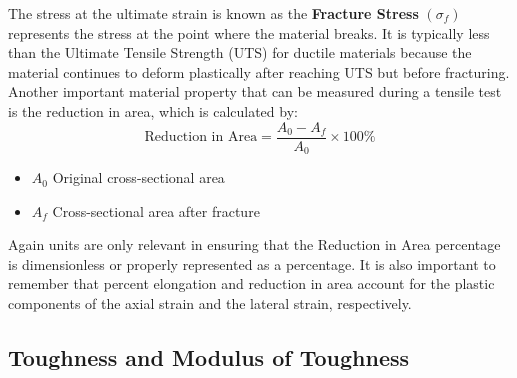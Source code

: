 \documentclass{article}
\begin{document}
{The stress at the ultimate strain is known as the \textbf{Fracture Stress} \((\sigma_f)\) represents the stress at the point where the material breaks. It is typically less than the Ultimate Tensile Strength (UTS) for ductile materials because the material continues to deform plastically after reaching UTS but before fracturing.\\[8pt]
Another important material property that can be measured during a tensile test is the reduction in area, which is calculated by:
\begin{equation}
    \text{Reduction in Area} = \frac{A_0 - A_f}{A_0} \times 100\%
\end{equation}
\begin{itemize}[itemsep=-1mm]
    \item $A_0$ Original cross-sectional area
    \item $A_f$ Cross-sectional area after fracture
\end{itemize}
Again units are only relevant in ensuring that the Reduction in Area percentage is dimensionless or properly represented as a percentage. It is also important to remember that percent elongation and reduction in area account for the plastic components of the axial strain and the lateral strain, respectively.\\



    \newpage

\subsection{Toughness and Modulus of Toughness}

}
\end{document}
